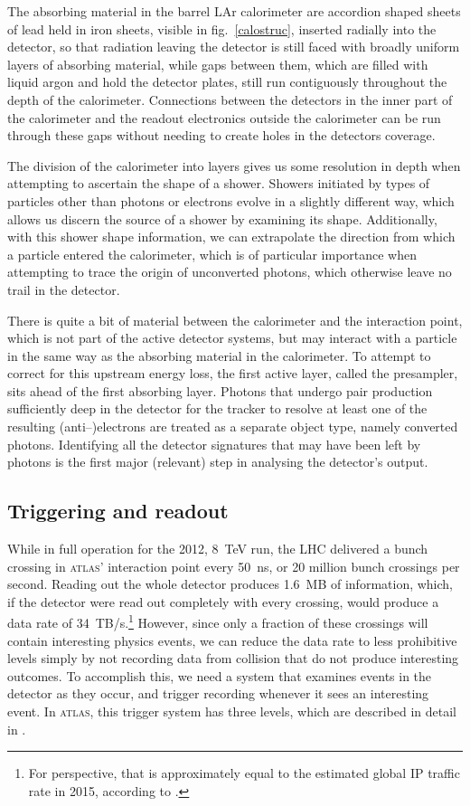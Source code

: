 The absorbing material in the barrel LAr calorimeter are accordion shaped sheets of lead held in iron sheets, visible in fig.~\ref{calostruc}, inserted radially into the detector, so that radiation leaving the detector is still faced with broadly uniform layers of absorbing material, while gaps between them, which are filled with liquid argon and hold the detector plates, still run contiguously throughout the depth of the calorimeter. Connections between the detectors in the inner part of the calorimeter and the readout electronics outside the calorimeter can be run through these gaps without needing to create holes in the detectors coverage.

The division of the calorimeter into layers gives us some resolution in depth when attempting to ascertain the shape of a shower. Showers initiated by types of particles other than photons or electrons evolve in a slightly different way, which allows us discern the source of a shower by examining its shape. Additionally, with this shower shape information, we can extrapolate the direction from which a particle entered the calorimeter, which is of particular importance when attempting to trace the origin of unconverted photons, which otherwise leave no trail in the detector.

There is quite a bit of material between the calorimeter and the interaction point, which is not part of the active detector systems, but may interact with a particle in the same way as the absorbing material in the calorimeter. To attempt to correct for this upstream energy loss, the first active layer, called the presampler, sits ahead of the first absorbing layer. Photons that undergo pair production sufficiently deep in the detector for the tracker to resolve at least one of the resulting (anti--)electrons are treated as a separate object type, namely converted photons. Identifying all the detector signatures that may have been left by photons is the first major (relevant) step in analysing the detector's output.

\subsection{Triggering and readout}
While in full operation for the 2012, 8~TeV run, the LHC delivered a bunch crossing in \textsc{atlas}' interaction point every 50~ns, or 20 million bunch crossings per second. Reading out the whole detector produces 1.6~MB of information, which, if the detector were read out completely with every crossing, would produce a data rate of 34~TB/s.\footnote{For perspective, that is approximately equal to the estimated global IP traffic rate in 2015, according to \cite{wolframip}.} However, since only a fraction of these crossings will contain interesting physics events, we can reduce the data rate to less prohibitive levels simply by not recording data from collision that do not produce interesting outcomes. To accomplish this, we need a system that examines events in the detector as they occur, and trigger recording whenever it sees an interesting event. In \textsc{atlas}, this trigger system has three levels, which are described in detail in \cite{detectorpaper}. 

